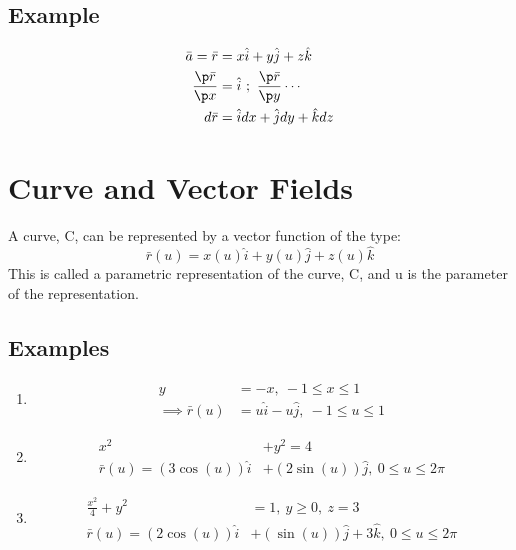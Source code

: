 \documentclass[a4paper, 11pt, normalem]{report}
\begin{document}
\subsection{Example}
\begin{align*}
    \bar{a} = \bar{r} &= x\hat{i} + y\hat{j} + z\hat{k} \\
    \frac{\p \bar{r}}{\p x} &= \hat{i} ~;~ \frac{\p \bar{r}}{\p y} \cdots \\
    d\bar{r} &= \hat{i}dx + \hat{j}dy + \hat{k}dz
\end{align*}

\section{Curve and Vector Fields}
A curve, C, can be represented by a vector function of the type:
\begin{equation*}
    \bar{r}(u) = x(u)\hat{i} + y(u)\hat{j} + z(u)\hat{k}
\end{equation*}
This is called a parametric representation of the curve, C, and u is the parameter of the representation.

\subsection{Examples}
\begin{enumerate}
    \item
            \begin{align*}
                y &= -x,~ -1 \leq x \leq 1 \\
                \implies \bar{r}(u) &= u\hat{i} - u\hat{j},~ -1 \leq u \leq 1
            \end{align*}
    \item
            \begin{align*}
                x^2 &+ y^2 = 4 \\
                \bar{r}(u) = (3\cos(u))\hat{i} &+ (2\sin(u))\hat{j},~ 0 \leq u \leq 2\pi
            \end{align*}
    \item
            \begin{align*}
                \frac{x^2}{4} + y^2 &= 1,~ y \geq 0,~ z = 3 \\
                \bar{r}(u) = (2\cos(u))\hat{i} &+ (\sin(u))\hat{j} + 3\hat{k},~ 0 \leq u \leq 2\pi
            \end{align*}
\end{enumerate}
\end{document}
